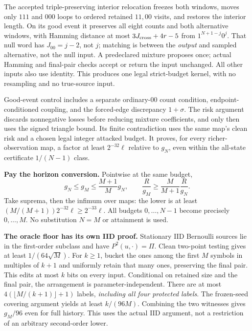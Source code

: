 \documentclass[10pt]{article}
\begin{document}
The accepted triple-preserving interior relocation freezes both windows, moves only $111$ and $000$ loops to ordered retained $11,00$ visits, and restores the interior length. On its good event it preserves all eight counts and both alternative windows, with Hamming distance at most $3J_{\rm cross}+4r-5$ from $1^{N+1-j}0^j$. That null word has $J_{00}=j-2$, not $j$; matching is between the \emph{output} and sampled alternative, not the null input. A predeclared mixture proposes once; actual Hamming and final-pair checks accept or return the input unchanged. All other inputs also use identity. This produces one legal strict-budget kernel, with no resampling and no true-source input.

Good-event control includes a separate ordinary-$00$ count condition, endpoint-conditioned coupling, and the forced-edge discrepancy $1+\sigma$. The risk argument discards nonnegative losses before reducing mixture coefficients, and only then uses the signed triangle bound. Its finite contradiction uses the same map's clean risk and a chosen legal integer attacked budget. It proves, for every richer-observation map, a factor at least $2^{-32}\ell$ relative to $g_N$, even within the all-state certificate $1/(N-1)$ class.

\textbf{Pay the horizon conversion.} Pointwise at the same budget,
\[
 g_N\le g_M\le\frac{M+1}{M}g_N,\qquad
 \frac{R}{g_M}\ge\frac{M}{M+1}\frac{R}{g_N}.
\]
Take suprema, then the infimum over maps: the lower is at least $(M/(M+1))2^{-32}\ell\ge2^{-33}\ell$. All budgets $0,\ldots,N-1$ become precisely $0,\ldots,M$. No substitution $N=M$ or attainment is used.

\textbf{The oracle floor has its own IID proof.} Stationary IID Bernoulli sources lie in the first-order subclass and have $P^2(u,\cdot)=\Pi$. Clean two-point testing gives at least $1/(64\sqrt M)$. For $k\ge1$, bucket the ones among the first $M$ symbols in multiples of $k+1$ and uniformly retain that many ones, preserving the final pair. This edits at most $k$ bits on every input. Conditional on retained size and the final pair, the arrangement is parameter-independent. There are at most $4(\lfloor M/(k+1)\rfloor+1)$ labels, \emph{including all four protected labels}. The frozen-seed covering argument yields at least $k/(96M)$. Combining the two witnesses gives $g_M/96$ even for full history. This uses the actual IID argument, not a restriction of an arbitrary second-order lower.
\newpage
\end{document}
